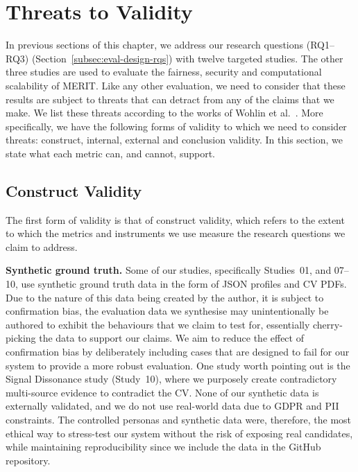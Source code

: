 \section{Threats to Validity}
\label{sec:threats-to-validity}

In previous sections of this chapter, we address our research questions (RQ1--RQ3) 
(Section~\ref{subsec:eval-design-rqs})
with twelve targeted studies. The other three studies are used to evaluate the fairness, 
security and computational scalability of MERIT. Like any other evaluation, we need to consider that these
results are subject to threats that can detract from any of the claims that we make. We list these threats
according to the works of Wohlin et al.~\cite{wohlin_threats}. More specifically, we have the following forms of
validity to which we need to consider threats: construct, internal, external and conclusion validity.
In this section, we state what each metric can, and cannot, support. 

\subsection{Construct Validity}
\label{subsec:construct-validity}

The first form of validity is that of construct validity, which refers to the extent
to which the metrics and instruments we use measure the research questions we claim to address.

\textbf{Synthetic ground truth.}
Some of our studies, specifically Studies~01, and 07--10, use synthetic ground truth data in the form of
JSON profiles and CV PDFs. Due to the nature of this data being created by the author, it is subject to
confirmation bias, the evaluation data we synthesise may unintentionally be authored to exhibit the
behaviours that we claim to test for, essentially cherry-picking the data to support our claims.
We aim to reduce the effect of confirmation bias by deliberately including cases that are designed to
fail for our system to provide a more robust evaluation. One study worth pointing out is the Signal
Dissonance study (Study~10), where we purposely create contradictory multi-source evidence to 
contradict the CV. None of our synthetic data is externally validated, and we do not use
real-world data due to GDPR and PII constraints. The controlled personas and synthetic data
were, therefore, the most ethical way to stress-test our system without the risk of exposing real candidates,
while maintaining reproducibility since we include the data in the GitHub repository.

